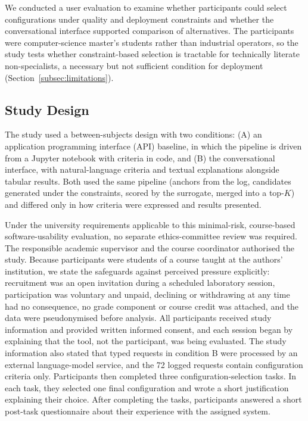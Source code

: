 \documentclass[final,5p,times,twocolumn]{elsarticle}
\begin{document}
We conducted a user evaluation to examine whether participants could
select configurations under quality and deployment constraints and
whether the conversational interface supported comparison of
alternatives. The participants were computer-science master's students
rather than industrial operators, so the study tests whether
constraint-based selection is tractable for technically literate
non-specialists, a necessary but not sufficient condition for
deployment (Section~\ref{subsec:limitations}).

\subsection{Study Design}
\label{subsec:study-design}

The study used a between-subjects design with two conditions: (A) an
application programming interface (API) baseline, in which the
pipeline is driven from a Jupyter notebook with criteria in code, and
(B) the conversational interface, with natural-language criteria and
textual explanations alongside tabular results. Both used the same
pipeline (anchors from the log, candidates generated under the
constraints, scored by the surrogate, merged into a top-$K$) and
differed only in how criteria were expressed and results presented.

Under the university requirements applicable to this minimal-risk,
course-based software-usability evaluation, no separate
ethics-committee review was required. The responsible academic supervisor and the course coordinator authorised the study. Because
participants were students of a course taught at the authors'
institution, we state the safeguards against perceived pressure
explicitly: recruitment was an open invitation during a scheduled
laboratory session, participation was voluntary and unpaid, declining
or withdrawing at any time had no consequence, no grade component or
course credit was attached, and the data were pseudonymised before
analysis. All participants received study information and provided
written informed consent, and each session began by explaining that the tool, not the participant, was being evaluated. The study information also stated that typed requests in condition B were processed by an external language-model service, and the 72 logged requests contain configuration criteria only. Participants then
completed three configuration-selection tasks. In each task, they
selected one final configuration and wrote a short justification
explaining their choice. After completing the tasks, participants
answered a short post-task questionnaire about their experience with
the assigned system.
\end{document}
